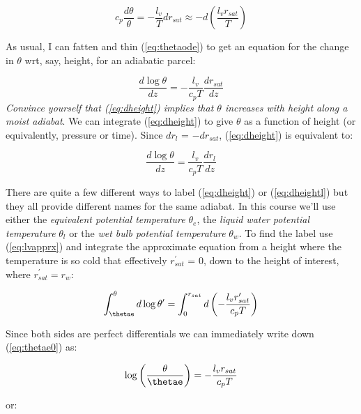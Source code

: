 \documentclass[12pt]{article}
\begin{document}
\begin{equation}
\label{eq:thetaode}
c_p \frac{ d \theta}{\theta} = - \frac{l_v}{T} d r_{sat} \approx - d \left ( \frac{l_v r_{sat}}{ T} \right )  
\end{equation}

As usual, I can fatten and thin (\ref{eq:thetaode}) to get an equation
for the change in $\theta$ wrt, say, height, for an adiabatic parcel:

\begin{equation}
\label{eq:dheight}
 \frac{ d \log \theta}{dz} = - \frac{l_v}{c_ p T}\frac{ d r_{sat}}{dz}
\end{equation}
\textit{Convince yourself that (\ref{eq:dheight}) implies that
  $\theta$ increases with height along a moist adiabat}.  We can
integrate (\ref{eq:dheight}) to give $\theta$ as a function of height
(or equivalently, pressure or time).  Since
$dr_l$ = $-dr_{sat}$, (\ref{eq:dheight}) is equivalent to:

\begin{equation}
\label{eq:dheightl}
 \frac{ d \log \theta}{dz} = \frac{l_v}{c_ p T}\frac{d r_l}{dz}
\end{equation}

There are quite a few different ways to label (\ref{eq:dheight}) or 
(\ref{eq:dheightl}) but they all provide different names for the
same adiabat.  In this course we'll use either the 
\textit{equivalent potential temperature} $\theta_e$, the 
\textit{liquid water potential temperature} $\theta_l$ or the
\textit{wet bulb potential temperature} $\theta_w$.  To find the
\thetae label use (\ref{eq:lvapprx}) and integrate the approximate
equation from a height where the temperature is so cold that
effectively $r_{sat}^\prime$ = 0, down to the height of interest, where
$r_{sat}^\prime = r_w$:

\begin{equation}
  \label{eq:thetae0}
  \int_{\thetae}^\theta d \log \theta^\prime = 
\int_0^{r_{sat}} d \left ( - \frac{l_v r_{sat}^\prime}{c_p T} \right )
\end{equation}

Since both sides are perfect differentials we can immediately write
down (\ref{eq:thetae0}) as:

\begin{equation}
  \label{eq:thetae1}
  \log \left ( \frac{\theta}{\thetae} \right ) = -\frac{l_v r_{sat}}{c_p T} 
\end{equation}

or:
\end{document}
